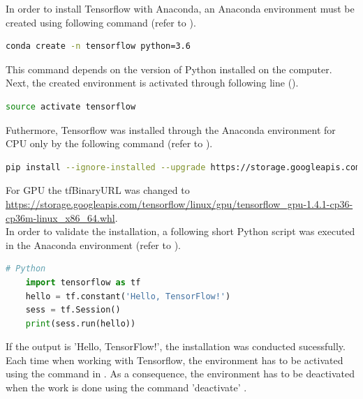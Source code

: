 In order to install Tensorflow with Anaconda, an Anaconda environment must be created using following command (refer to ).

\begin{lstlisting}[caption=Creating an Anaconda environment, label=list:tensorflow_anaconda, language=bash]
	conda create -n tensorflow python=3.6
\end{lstlisting}

This command depends on the version of Python installed on the computer. Next, the created environment is activated through following line ().

\begin{lstlisting}[caption=Activating the Anaconda environment, label=list:activation_anaconda, language=bash]
	source activate tensorflow
\end{lstlisting}

Futhermore, Tensorflow was installed through the Anaconda environment for CPU only by the following command (refer to ).

\begin{lstlisting}[caption=Installing Tensorflow through Anaconda, label=list:installing_tensorflow_anaconda, language=bash]
	pip install --ignore-installed --upgrade https://storage.googleapis.com/tensorflow/linux/cpu/	tensorflow-1.4.1-cp36-cp36m-linux_x86_64.whl
\end{lstlisting}

For GPU the tfBinaryURL was changed to \url{https://storage.googleapis.com/tensorflow/linux/gpu/tensorflow_gpu-1.4.1-cp36-cp36m-linux_x86_64.whl}. \\

In order to validate the installation, a following short Python script was executed in the Anaconda environment (refer to ).

\begin{lstlisting}[caption=Installing Tensorflow through Anaconda, label=list:validation_installation, language=python]
	# Python
	import tensorflow as tf
	hello = tf.constant('Hello, TensorFlow!')
	sess = tf.Session()
	print(sess.run(hello))
\end{lstlisting}

If the output is 'Hello, TensorFlow!', the installation was conducted sucessfully. Each time when working with Tensorflow, the environment has to be activated using the command in . As a consequence, the environment has to be deactivated when the work is done using the command 'deactivate' \citep{InstallTensorflow}.

